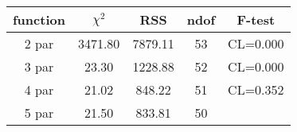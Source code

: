 \begin{tabular}{c|c|c|c|c}
function & $\chi^2$ & RSS & ndof & F-test \\
\hline
2 par & 3471.80 & 7879.11 & 53 & CL=0.000 \\
3 par & 23.30 & 1228.88 & 52 & CL=0.000 \\
4 par & 21.02 & 848.22 & 51 & CL=0.352 \\
5 par & 21.50 & 833.81 & 50 & \\
\hline
\end{tabular}